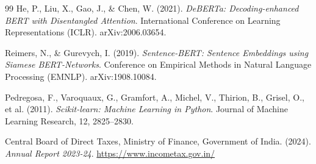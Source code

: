 \documentclass[12pt, a4paper, oneside]{report}
\begin{document}
\begin{thebibliography}{99}
He, P., Liu, X., Gao, J., \& Chen, W. (2021). \textit{DeBERTa:
Decoding-enhanced BERT with Disentangled Attention}. International Conference on
Learning Representations (ICLR). arXiv:2006.03654.

Reimers, N., \& Gurevych, I. (2019). \textit{Sentence-BERT: Sentence Embeddings
using Siamese BERT-Networks}. Conference on Empirical Methods in Natural Language
Processing (EMNLP). arXiv:1908.10084.

Pedregosa, F., Varoquaux, G., Gramfort, A., Michel, V., Thirion, B., Grisel, O.,
et al. (2011). \textit{Scikit-learn: Machine Learning in Python}. Journal of
Machine Learning Research, 12, 2825--2830.

Central Board of Direct Taxes, Ministry of Finance, Government of India. (2024).
\textit{Annual Report 2023-24}. \url{https://www.incometax.gov.in/}


\end{thebibliography}
\end{document}
